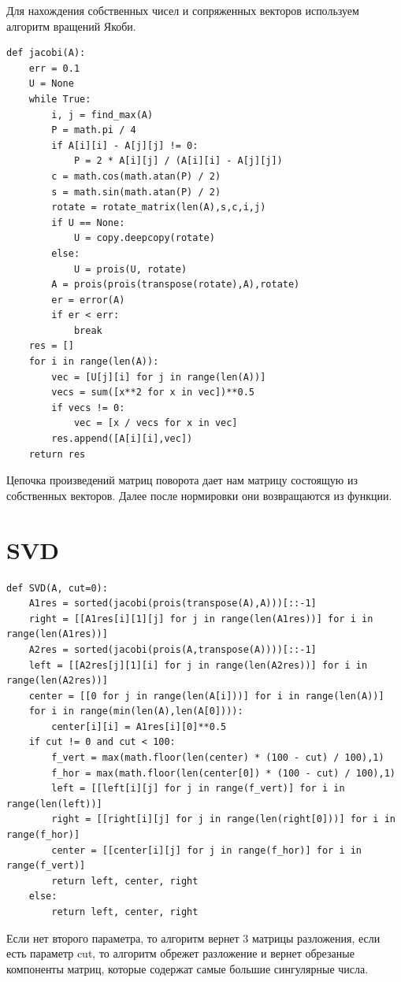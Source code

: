 \documentclass[pdf, unicode, 12pt, a4paper,oneside,fleqn]{article}
\begin{document}
Для нахождения собственных чисел и сопряженных векторов используем алгоритм вращений Якоби.

\begin{lstlisting}
def jacobi(A):
    err = 0.1
    U = None
    while True:
        i, j = find_max(A)
        P = math.pi / 4
        if A[i][i] - A[j][j] != 0:
            P = 2 * A[i][j] / (A[i][i] - A[j][j])
        c = math.cos(math.atan(P) / 2)
        s = math.sin(math.atan(P) / 2)
        rotate = rotate_matrix(len(A),s,c,i,j)
        if U == None:
            U = copy.deepcopy(rotate)
        else:
            U = prois(U, rotate)
        A = prois(prois(transpose(rotate),A),rotate)
        er = error(A)
        if er < err:
            break
    res = []
    for i in range(len(A)):
        vec = [U[j][i] for j in range(len(A))]
        vecs = sum([x**2 for x in vec])**0.5
        if vecs != 0:
            vec = [x / vecs for x in vec]
        res.append([A[i][i],vec])
    return res
\end{lstlisting}

Цепочка произведений матриц поворота дает нам матрицу состоящую из собственных векторов.
Далее после нормировки они возвращаются из функции.

\section{SVD}

\begin{lstlisting}
def SVD(A, cut=0):
    A1res = sorted(jacobi(prois(transpose(A),A)))[::-1]
    right = [[A1res[i][1][j] for j in range(len(A1res))] for i in range(len(A1res))]
    A2res = sorted(jacobi(prois(A,transpose(A))))[::-1]
    left = [[A2res[j][1][i] for j in range(len(A2res))] for i in range(len(A2res))]
    center = [[0 for j in range(len(A[i]))] for i in range(len(A))]
    for i in range(min(len(A),len(A[0]))):
        center[i][i] = A1res[i][0]**0.5
    if cut != 0 and cut < 100:
        f_vert = max(math.floor(len(center) * (100 - cut) / 100),1)
        f_hor = max(math.floor(len(center[0]) * (100 - cut) / 100),1)
        left = [[left[i][j] for j in range(f_vert)] for i in range(len(left))]
        right = [[right[i][j] for j in range(len(right[0]))] for i in range(f_hor)]
        center = [[center[i][j] for j in range(f_hor)] for i in range(f_vert)]
        return left, center, right
    else:
        return left, center, right
\end{lstlisting}

Если нет второго параметра, то алгоритм вернет 3 матрицы разложения, если есть параметр cut, то алгоритм обрежет разложение и вернет обрезаные компоненты матриц, которые содержат самые большие сингулярные числа.
\end{document}
